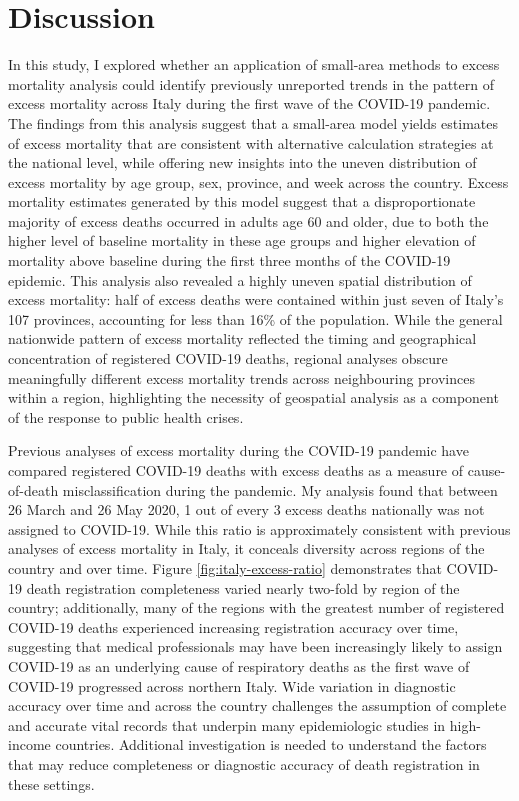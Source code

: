 \documentclass[
]{report}
\begin{document}
\hypertarget{discussion-3}{%
\section{Discussion}\label{discussion-3}}

In this study, I explored whether an application of small-area methods to excess mortality analysis could identify previously unreported trends in the pattern of excess mortality across Italy during the first wave of the COVID-19 pandemic. The findings from this analysis suggest that a small-area model yields estimates of excess mortality that are consistent with alternative calculation strategies at the national level, while offering new insights into the uneven distribution of excess mortality by age group, sex, province, and week across the country. Excess mortality estimates generated by this model suggest that a disproportionate majority of excess deaths occurred in adults age 60 and older, due to both the higher level of baseline mortality in these age groups and higher elevation of mortality above baseline during the first three months of the COVID-19 epidemic. This analysis also revealed a highly uneven spatial distribution of excess mortality: half of excess deaths were contained within just seven of Italy's 107 provinces, accounting for less than 16\% of the population. While the general nationwide pattern of excess mortality reflected the timing and geographical concentration of registered COVID-19 deaths, regional analyses obscure meaningfully different excess mortality trends across neighbouring provinces within a region, highlighting the necessity of geospatial analysis as a component of the response to public health crises.

Previous analyses of excess mortality during the COVID-19 pandemic have compared registered COVID-19 deaths with excess deaths as a measure of cause-of-death misclassification during the pandemic.\autocite{Weinberger2020a,Woolf2020,Alicandro2020} My analysis found that between 26 March and 26 May 2020, 1 out of every 3 excess deaths nationally was not assigned to COVID-19. While this ratio is approximately consistent with previous analyses of excess mortality in Italy,\autocite{Alicandro2020} it conceals diversity across regions of the country and over time. Figure \ref{fig:italy-excess-ratio} demonstrates that COVID-19 death registration completeness varied nearly two-fold by region of the country; additionally, many of the regions with the greatest number of registered COVID-19 deaths experienced increasing registration accuracy over time, suggesting that medical professionals may have been increasingly likely to assign COVID-19 as an underlying cause of respiratory deaths as the first wave of COVID-19 progressed across northern Italy. Wide variation in diagnostic accuracy over time and across the country challenges the assumption of complete and accurate vital records that underpin many epidemiologic studies in high-income countries. Additional investigation is needed to understand the factors that may reduce completeness or diagnostic accuracy of death registration in these settings.
\end{document}
